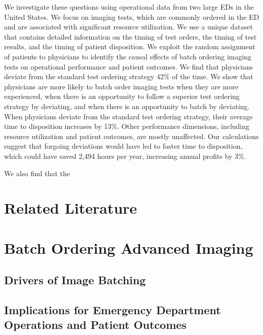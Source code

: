 \documentclass[,mnsc,nonblindrev]{informs}
\begin{document}
We investigate these questions using operational data from two large EDs
in the United States. We focus on imaging tests, which are commonly
ordered in the ED and are associated with significant resource
utilization. We use a unique dataset that contains detailed information
on the timing of test orders, the timing of test results, and the timing
of patient disposition. We exploit the random assignment of patients to
physicians to identify the causal effects of batch ordering imaging
tests on operational performance and patient outcomes. We find that
physicians deviate from the standard test ordering strategy 42\% of the
time. We show that physicians are more likely to batch order imaging
tests when they are more experienced, when there is an opportunity to
follow a superior test ordering strategy by deviating, and when there is
an opportunity to batch by deviating. When physicians deviate from the
standard test ordering strategy, their average time to disposition
increases by 13\%. Other performance dimensions, including resource
utilization and patient outcomes, are mostly unaffected. Our
calculations suggest that forgoing deviations would have led to faster
time to disposition, which could have saved 2,494 hours per year,
increasing annual profits by 3\%.

We also find that the

\hypertarget{related-literature}{%
\section{Related Literature}\label{related-literature}}

\hypertarget{batch-ordering-advanced-imaging}{%
\section{Batch Ordering Advanced
Imaging}\label{batch-ordering-advanced-imaging}}

\hypertarget{drivers-of-image-batching}{%
\subsection{Drivers of Image Batching}\label{drivers-of-image-batching}}

\hypertarget{implications-for-emergency-department-operations-and-patient-outcomes}{%
\subsection{Implications for Emergency Department Operations and Patient
Outcomes}\label{implications-for-emergency-department-operations-and-patient-outcomes}}
\end{document}
